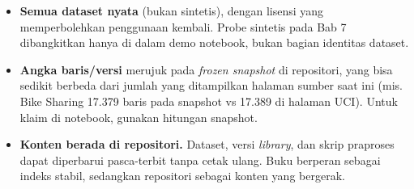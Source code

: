 \begin{itemize}
\tightlist
\item
  \textbf{Semua dataset nyata} (bukan sintetis), dengan lisensi yang memperbolehkan
  penggunaan kembali. Probe sintetis pada Bab 7 dibangkitkan hanya di dalam demo notebook, bukan bagian identitas dataset.
\item
  \textbf{Angka baris/versi} merujuk pada \emph{frozen snapshot} di repositori, yang bisa
  sedikit berbeda dari jumlah yang ditampilkan halaman sumber saat ini
  (mis. Bike Sharing 17.379 baris pada snapshot vs 17.389 di halaman UCI). Untuk
  klaim di notebook, gunakan hitungan snapshot.
\item
  \textbf{Konten berada di repositori.} Dataset, versi \emph{library}, dan skrip praproses
  dapat diperbarui pasca-terbit tanpa cetak ulang. Buku berperan sebagai indeks
  stabil, sedangkan repositori sebagai konten yang bergerak.
\end{itemize}
